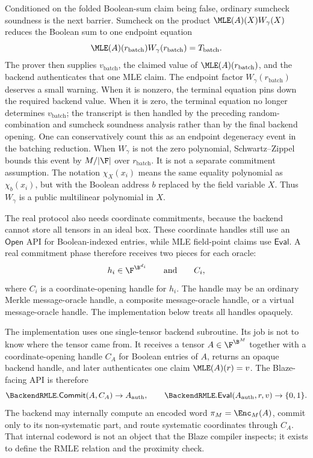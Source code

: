 Conditioned on the folded Boolean-sum claim being false, ordinary sumcheck
soundness is the next barrier.  Sumcheck on the product
\(\MLE(A)(X)W_\gamma(X)\) reduces the Boolean sum to one endpoint equation
\[
  \MLE(A)(r_{\mathrm{batch}})W_\gamma(r_{\mathrm{batch}})
  =
  T_{\mathrm{batch}}.
\]
The prover then supplies \(v_{\mathrm{batch}}\), the claimed value of
\(\MLE(A)(r_{\mathrm{batch}})\), and the backend authenticates that one MLE
claim.
The endpoint factor \(W_\gamma(r_{\mathrm{batch}})\) deserves a small warning.
When it is nonzero, the terminal equation pins down the required backend value.
When it is zero, the terminal equation no longer determines
\(v_{\mathrm{batch}}\); the transcript is then handled by the preceding
random-combination and sumcheck soundness analysis rather than by the final
backend opening.  One can conservatively count this as an endpoint degeneracy
event in the batching reduction.  When \(W_\gamma\) is not the zero polynomial,
Schwartz--Zippel bounds this event by \(M/|\F|\) over
\(r_{\mathrm{batch}}\).  It is not a separate commitment assumption.
The notation \(\chi_X(x_i)\) means the same equality polynomial as
\(\chi_b(x_i)\), but with the Boolean address \(b\) replaced by the field
variable \(X\).  Thus \(W_\gamma\) is a public multilinear polynomial in \(X\).

The real protocol also needs coordinate commitments, because the backend cannot
store all tensors in an ideal box.  These coordinate handles still use an
\(\mathsf{Open}\) API for Boolean-indexed entries, while MLE field-point claims
use \(\mathsf{Eval}\).  A real commitment phase therefore receives two pieces
for each oracle:
\[
  h_i\in\F^{\B^{d_i}}
  \qquad\text{and}\qquad
  C_i,
\]
where \(C_i\) is a coordinate-opening handle for \(h_i\).  The handle may be an
ordinary Merkle message-oracle handle, a composite message-oracle handle, or a
virtual message-oracle handle.  The implementation below treats all handles
opaquely.

The implementation uses one single-tensor backend subroutine.  Its job is not
to know where the tensor came from.  It receives a tensor
\(A\in\F^{\B^M}\) together with a coordinate-opening handle \(C_A\) for
Boolean entries of \(A\), returns an opaque backend handle, and later
authenticates one claim \(\MLE(A)(r)=v\).  The Blaze-facing API is therefore
\[
  \BackendRMLE.\mathsf{Commit}(A,C_A)\to A_{\mathrm{auth}},
  \qquad
  \BackendRMLE.\mathsf{Eval}(A_{\mathrm{auth}},r,v)\to\{0,1\}.
\]
The backend may internally compute an encoded word
\(\pi_M=\Enc_M(A)\), commit only to its non-systematic part, and route
systematic coordinates through \(C_A\).  That internal codeword is not an
object that the Blaze compiler inspects; it exists to define the RMLE relation
and the proximity check.

